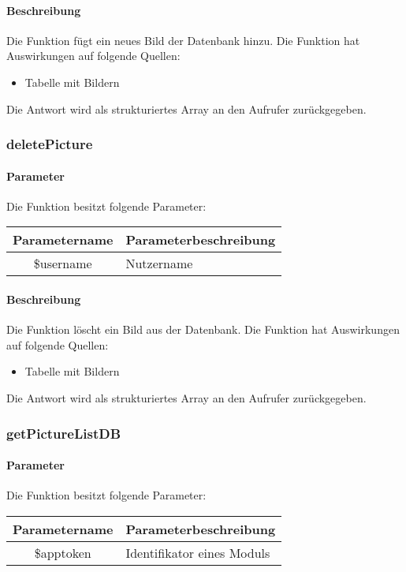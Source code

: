 \paragraph{Beschreibung} Die Funktion fügt ein neues Bild der Datenbank hinzu. Die Funktion hat Auswirkungen auf folgende Quellen:
\begin{itemize}
	\item Tabelle mit Bildern
\end{itemize}
Die Antwort wird als strukturiertes Array an den Aufrufer zurückgegeben.
\subsubsection{deletePicture}
\paragraph{Parameter} Die Funktion besitzt folgende Parameter:
\begin{table}[H]
	\begin{tabular}{|c|p{11cm}|}
		\hline
		\textbf{Parametername} & \textbf{Parameterbeschreibung} \\ \hline
		\$username & Nutzername \\ \hline
	\end{tabular}
\end{table}
\paragraph{Beschreibung} Die Funktion löscht ein Bild aus der Datenbank. Die Funktion hat Auswirkungen auf folgende Quellen:
\begin{itemize}
	\item Tabelle mit Bildern
\end{itemize}
Die Antwort wird als strukturiertes Array an den Aufrufer zurückgegeben.
\subsubsection{getPictureListDB}
\paragraph{Parameter} Die Funktion besitzt folgende Parameter:
\begin{table}[H]
	\begin{tabular}{|c|p{11cm}|}
		\hline
		\textbf{Parametername} & \textbf{Parameterbeschreibung} \\ \hline
		\$apptoken & Identifikator eines Moduls \\ \hline
	\end{tabular}
\end{table}
